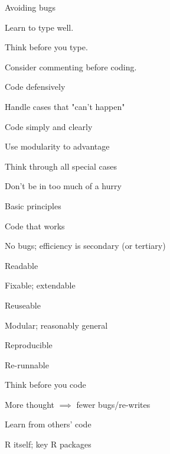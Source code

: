 \documentclass[12pt,t]{beamer}
\begin{document}
\begin{frame}{Avoiding bugs}

\bbi
\item Learn to type well.
\item Think before you type.
\item Consider commenting before coding.
\item Code defensively
  \bi
  \item Handle cases that "can't happen"
  \ei
\item Code simply and clearly
\item Use modularity to advantage
\item Think through all special cases
\item Don't be in too much of a hurry
\ei

\end{frame}





\begin{frame}{Basic principles}

\vspace{18pt}

\bi
\item Code that works
    \bi
    \item[] No bugs; efficiency is secondary (or tertiary)
    \ei
\item Readable
    \bi
    \item[] Fixable; extendable
    \ei
\item Reuseable
    \bi
    \item[] Modular; reasonably general
    \ei
\item Reproducible
    \bi
    \item[] Re-runnable
    \ei
\item Think before you code
    \bi
    \item[] More thought $\implies$ fewer bugs/re-writes
    \ei
\item Learn from others' code
    \bi
    \item[] R itself; key R packages
    \ei
\ei

\end{frame}
\end{document}
